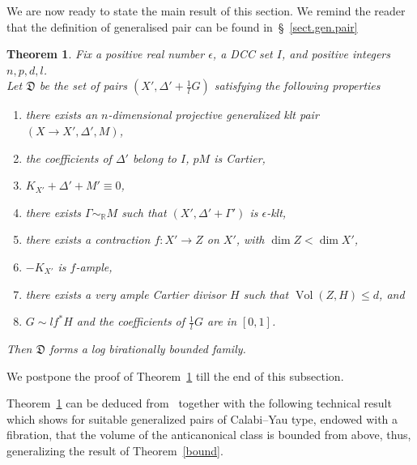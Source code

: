 \documentclass{amsart}[12pt,a4paper]
\newtheorem{theorem}{Theorem}[section]
\theoremstyle{definition}
\DeclareMathOperator{\Vol}{\mathrm{Vol}}
\newcommand{\rr}{\mathbb{R}}
\begin{document}
We are now ready to state the main result of this section.
We remind the reader that the definition of generalised pair can be found in~\S~\ref{sect.gen.pair}

\begin{theorem}
\label{log.birat.bnd.gen.pairs.thm}
Fix a positive real number $\epsilon$, a DCC set $I$,  and positive integers $n, p, d, l$. 
\\	
Let $\mathfrak{D}$ be the set of pairs $(X', \Delta'+\frac 1 l G)$ satisfying the following properties
\begin{enumerate}
	    \item there exists an $n$-dimensional projective generalized klt pair $(X \to X', \Delta', M)$,
	    \item the coefficients of $\Delta'$ belong to $I$, $pM$ is Cartier,
	    \item $K_{X'}+\Delta'+M' \equiv 0$, 
	    \item there exists $\Gamma \sim_\rr M$ such that 
	    $(X', \Delta'+\Gamma')$ is $\epsilon$-klt,
		\item there exists a contraction $f\colon X' \to Z$ on $X'$, with $\dim Z < \dim X'$, 
		\item $-K_{X'}$ is $f$-ample,
		\item there exists a very ample Cartier divisor $H$ such that $\Vol(Z,H)\leq d$, and 
	    \item $G \sim l f^\ast H$ and the coefficients of $\frac 1 l G$ are in $[0, 1]$.
	\end{enumerate}
Then $\mathfrak{D}$ forms a log birationally bounded family.
\end{theorem}

We postpone the proof of Theorem~\ref{log.birat.bnd.gen.pairs.thm} till the end of this subsection.

Theorem~\ref{log.birat.bnd.gen.pairs.thm} can be deduced from~\cite[Theorem~1.3]{bir.zhang} together with the following technical result which shows for suitable generalized pairs of Calabi--Yau type, endowed with a fibration, that the volume of the anticanonical class is bounded from above, thus, generalizing the result of Theorem~\ref{bound}.
\end{document}
